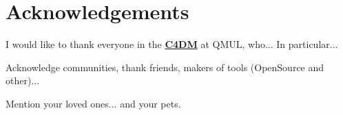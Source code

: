 
\chapter*{Acknowledgements}

I would like to thank everyone in the \textbf{\href{http://www.eecs.qmul.ac.uk/}{C4DM}} at QMUL, who... In particular...

Acknowledge communities, thank friends, makers of tools (OpenSource and other)...

Mention your loved ones... and your pets.

